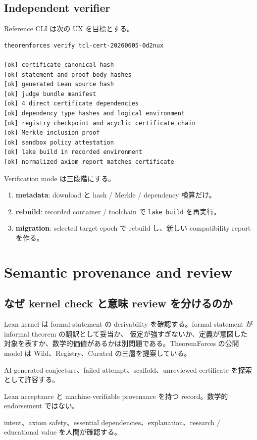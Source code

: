 \documentclass[a4paper,11pt]{ltjsarticle}
\newcommand{\term}[1]{\textbf{\color{TFNavy}#1}}
\begin{document}
\subsection{Independent verifier}

Reference CLI は次の UX を目標とする。

\begin{lstlisting}[language={},caption={目標とする verification UX}]
theoremforces verify tcl-cert-20260605-0d2nux

[ok] certificate canonical hash
[ok] statement and proof-body hashes
[ok] generated Lean source hash
[ok] judge bundle manifest
[ok] 4 direct certificate dependencies
[ok] dependency type hashes and logical environment
[ok] registry checkpoint and acyclic certificate chain
[ok] Merkle inclusion proof
[ok] sandbox policy attestation
[ok] lake build in recorded environment
[ok] normalized axiom report matches certificate
\end{lstlisting}

Verification mode は三段階にする。

\begin{enumerate}
  \item \term{metadata}: download と hash / Merkle / dependency 検算だけ。
  \item \term{rebuild}: recorded container / toolchain で \texttt{lake build} を再実行。
  \item \term{migration}: selected target epoch で rebuild し、新しい compatibility report を作る。
\end{enumerate}

\section{Semantic provenance and review}

\subsection{なぜ kernel check と意味 review を分けるのか}

Lean kernel は formal statement の derivability を確認する。formal statement が informal theorem の翻訳として妥当か、
仮定が強すぎないか、定義が意図した対象を表すか、数学的価値があるかは別問題である。TheoremForces の公開 model は
Wild、Registry、Curated の三層を提案している\cite{tfsemantic}。

\begin{description}[style=nextline,leftmargin=1.5em]
  \item[Wild] AI-generated conjecture、failed attempt、scaffold、unreviewed certificate を探索として許容する。
  \item[Registry] Lean acceptance と machine-verifiable provenance を持つ record。数学的 endorsement ではない。
  \item[Curated] intent、axiom safety、essential dependencies、explanation、research / educational value を人間が確認する。
\end{description}
\end{document}
